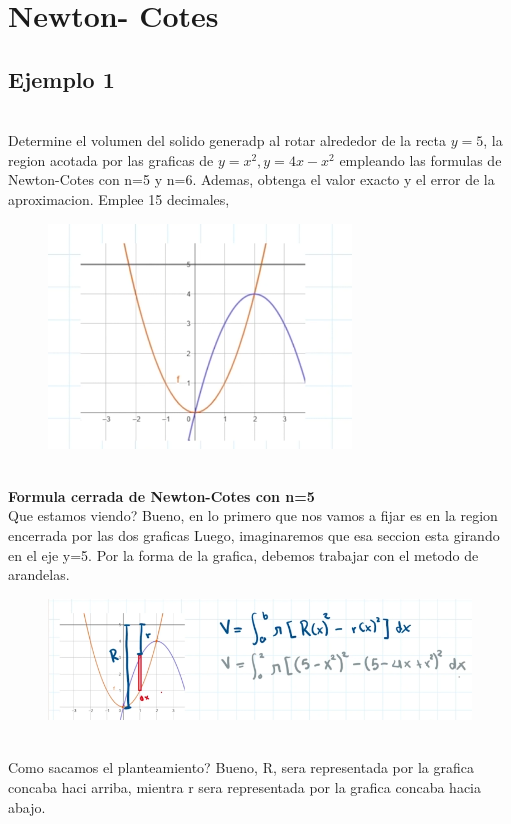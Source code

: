 \documentclass{article}
\theoremstyle{mytheoremstyle}
\theoremstyle{mytheoremstyle}
\theoremstyle{myproblemstyle}
\begin{document}
\section{Newton- Cotes}
\subsection{Ejemplo 1}

\noindent \\ Determine el volumen del solido generadp al rotar alrededor de la recta $y=5$, la region acotada
por las graficas de $y=x^2,y=4x-x^2$ empleando las formulas de Newton-Cotes con n=5 y n=6.
Ademas, obtenga el valor exacto y el error de la aproximacion. Emplee 15 decimales,
\begin{figure}[ht]
    \includegraphics[scale=0.6]{img/nc1_1.png}  
\end{figure}
\\ \textbf{Formula cerrada de Newton-Cotes con n=5}
\\ Que estamos viendo? Bueno, en lo primero que nos vamos a fijar es en la region encerrada por las dos graficas
Luego, imaginaremos que esa seccion esta girando en el eje y=5. Por la forma de la grafica, debemos trabajar con el metodo de arandelas.
\begin{figure}[ht]
    \includegraphics[scale=0.8]{img/nc1_2.png}  
\end{figure}
\\ Como sacamos el planteamiento? Bueno, R, sera representada por la grafica concaba haci arriba, mientra r sera representada por la grafica concaba hacia abajo.
\end{document}
